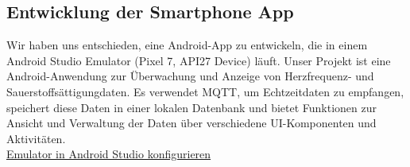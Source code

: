 \documentclass[conference,a4paper,flushend]{cs-techrep}
\begin{document}
\subsection{Entwicklung der Smartphone App}
Wir haben uns entschieden, eine Android-App zu entwickeln, die in einem Android Studio Emulator (Pixel 7, API27 Device) läuft. Unser Projekt ist eine Android-Anwendung zur Überwachung und Anzeige von Herzfrequenz- und Sauerstoffsättigungdaten. Es verwendet MQTT, um Echtzeitdaten zu empfangen, speichert diese Daten in einer lokalen Datenbank und bietet Funktionen zur Ansicht und Verwaltung der Daten über verschiedene UI-Komponenten und Aktivitäten. 
\vspace{0.5em}\\
\underline{Emulator in Android Studio konfigurieren}
\vspace{0.2em}
\end{document}
